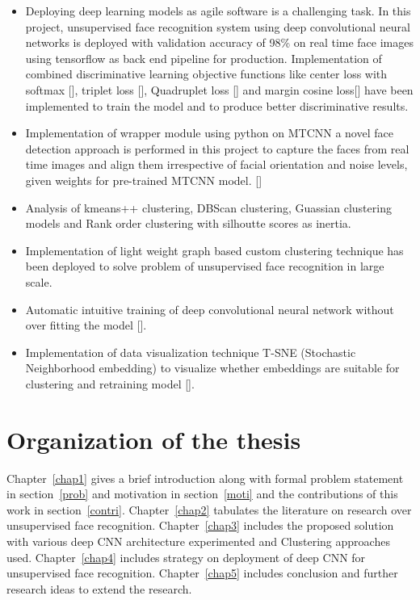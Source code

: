 \documentclass[a4paper,12pt, twoside]{NITKReport}
\begin{document}
\begin{itemize}
\item Deploying deep learning models as agile software is a challenging task. In this project, unsupervised face recognition system using deep convolutional neural networks is deployed with validation accuracy of 98\% on real time face images using tensorflow as back end pipeline for production. Implementation of combined discriminative learning objective functions like center loss with softmax [\cite{wen2016discriminative}], triplet loss [\cite{schroff2015facenet}], Quadruplet loss [\cite{chen2017beyond}] and margin cosine loss[\cite{DBLP:journals/corr/abs-1801-09414}] have been implemented to train the model and to produce better discriminative results.
\item Implementation of wrapper module using python on MTCNN a novel face detection approach is performed in this project to capture the faces from real time images and align them irrespective of facial orientation and noise levels, given weights for pre-trained MTCNN model. [\cite{xiang2017joint}]
\item Analysis of kmeans++ clustering, DBScan clustering, Guassian clustering models and Rank order clustering with silhoutte scores as inertia.
\item Implementation of light weight graph based custom clustering technique has been deployed to solve problem of unsupervised face recognition in large scale. 
\item Automatic intuitive training of deep convolutional neural network without over fitting the model [\cite{DBLP:journals/corr/CogswellAGZB15}].
\item Implementation of data visualization technique T-SNE (Stochastic Neighborhood embedding) to visualize whether embeddings are suitable for clustering and retraining model [\cite{maaten2008visualizing}].

\end{itemize}
	
\section{Organization of the thesis}
	Chapter~\ref{chap1} gives a brief introduction along with formal problem statement in section~\ref{prob} and motivation in section~\ref{moti} and the contributions of this work in section~\ref{contri}. Chapter~\ref{chap2} tabulates the literature on research over unsupervised face recognition. Chapter~\ref{chap3} includes the proposed solution with various deep CNN architecture experimented and Clustering approaches used. Chapter~\ref{chap4} includes strategy on deployment of deep CNN for unsupervised face recognition. Chapter~\ref{chap5} includes conclusion and further research ideas to extend the research.  
	
\end{document}
